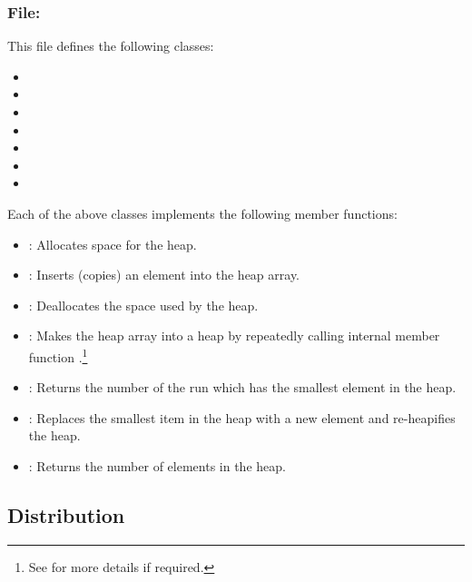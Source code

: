 \subsubsection{File: }

This file defines the following classes:
\begin{itemize}
    \item {}
    \item {}
    \item {}
    \item {}
    \item {}
    \item {}
    \item {}
\end{itemize}

Each of the above classes implements the following member
functions:
\begin{itemize}
    \item {}: Allocates space for the heap.
    \item {}: Inserts (copies) an element into
    the heap array.
    \item {}: Deallocates the space used by the heap.
    \item {}: Makes the heap array into a heap
    by repeatedly calling internal member function
    .\footnote{%
       See \cite{cormen:introduction} for more details if
       required.}
    \item {}: Returns the number of the
    run which has the smallest element in the heap.
    \item {}: Replaces the
    smallest item in the heap with a new element  and
    re-heapifies the heap.
    \item {}: Returns the number of elements
    in the heap.
\end{itemize}




\subsection{Distribution}

